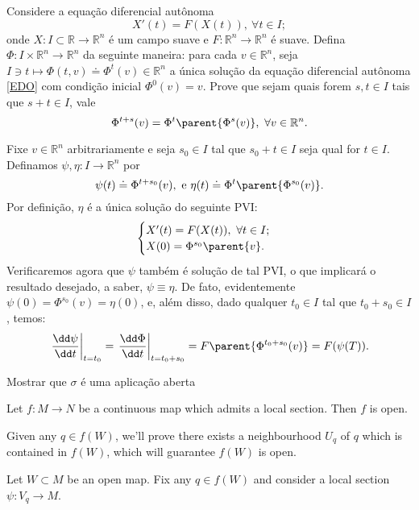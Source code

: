 




\begin{Mybox}
Considere a equação diferencial autônoma
\begin{equation}\label{EDO}
X'(t) = F(X(t)), \ \forall t \in I;
\end{equation}
onde $X: I \subset \mathbb{R} \to \mathbb{R}^n$ é um campo suave e $F: \mathbb{R}^n \to \mathbb{R}^n$ é suave. Defina $\Phi: I \times \mathbb{R}^n \to \mathbb{R}^n$ da seguinte maneira: para cada $v \in \mathbb{R}^n$, seja $I \ni t \mapsto \Phi(t, v) \doteq \Phi^t(v) \in \mathbb{R}^n$ a única solução da equação diferencial autônoma \cref{EDO} com condição inicial $\Phi^0(v) = v$. Prove que sejam quais forem $s, t \in I$ tais que $s+ t \in I$, vale
\[
\Phi^{t+s}(v) = \Phi^t\parent{\Phi^s(v)}, \ \forall v \in \mathbb{R}^n. 
\] 
\vspace{-1cm}
\end{Mybox}
\vspace{-.5cm}
\begin{dem}
Fixe $v \in \mathbb{R}^n$ arbitrariamente e seja $s_0 \in I$ tal que $s_0 + t\in I$ seja qual for $t \in I$. Definamos $\psi, \eta: I \to \mathbb{R}^n$ por
\[
\psi(t) \doteq \Phi^{t+s_0}(v), \text{ e } \eta(t) \doteq \Phi^{t}\parent{\Phi^{s_0}(v)}.
\]
Por definição, $\eta$ é a única solução do seguinte PVI:
\[
\begin{cases}
X'(t) = F(X(t)), \ \forall t \in I; \\
X(0) = \Phi^{s_0}\parent{v}.
\end{cases}
\]
Verificaremos agora que $\psi$ também é solução de tal PVI, o que implicará o resultado desejado, a saber, $\psi \equiv \eta$. De fato, evidentemente $\psi(0) = \Phi^{s_0}(v) = \eta(0)$, e, além disso, dado qualquer $t_0 \in I$ tal que $t_0 + s_0 \in I$, temos:
\begin{align*}
\left.\frac{\dd \psi}{\dd t} \right\vert_{t = t_0} = \left.\frac{\dd \Phi}{\dd t} \right\vert_{t = t_0 + s_0} = F\parent{\Phi^{t_0 + s_0}(v)} = F(\psi(T)).
\end{align*}
\end{dem}

\begin{Mybox}
Mostrar que $\sigma$ é uma aplicação aberta
\end{Mybox}
\vspace{-.5cm}
\begin{dem}
\begin{lema}
Let $f : M \to N$ be a continuous map which admits a local section. Then $f$ is open.
\end{lema}
Given any $q \in f(W)$, we'll prove there exists a neighbourhood $U_q$ of $q$ which is contained in $f(W)$, which will guarantee $f(W)$ is open.  \\
\begin{demm}
Let $W \subset M$ be an open map. Fix any $q \in f(W)$ and consider a local section $\psi: V_q \to M$.
\end{demm}
\end{dem}





